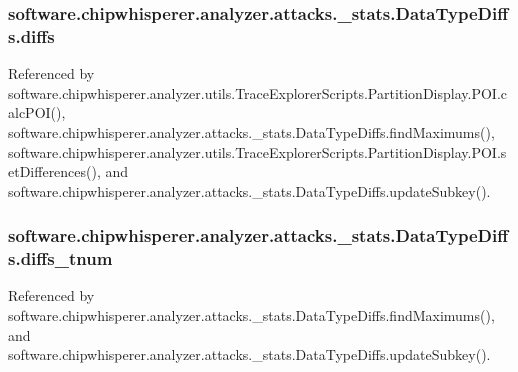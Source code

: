 \subsubsection[{diffs}]{\setlength{\rightskip}{0pt plus 5cm}software.\+chipwhisperer.\+analyzer.\+attacks.\+\_\+stats.\+Data\+Type\+Diffs.\+diffs}\label{classsoftware_1_1chipwhisperer_1_1analyzer_1_1attacks_1_1__stats_1_1DataTypeDiffs_adaab5796ed161daf2bcb0ee44930f34a}


Referenced by software.\+chipwhisperer.\+analyzer.\+utils.\+Trace\+Explorer\+Scripts.\+Partition\+Display.\+P\+O\+I.\+calc\+P\+O\+I(), software.\+chipwhisperer.\+analyzer.\+attacks.\+\_\+stats.\+Data\+Type\+Diffs.\+find\+Maximums(), software.\+chipwhisperer.\+analyzer.\+utils.\+Trace\+Explorer\+Scripts.\+Partition\+Display.\+P\+O\+I.\+set\+Differences(), and software.\+chipwhisperer.\+analyzer.\+attacks.\+\_\+stats.\+Data\+Type\+Diffs.\+update\+Subkey().

\hypertarget{classsoftware_1_1chipwhisperer_1_1analyzer_1_1attacks_1_1__stats_1_1DataTypeDiffs_a234110495a5f5f87a6d5a0e4e0db7860}{}
\subsubsection[{diffs\+\_\+tnum}]{\setlength{\rightskip}{0pt plus 5cm}software.\+chipwhisperer.\+analyzer.\+attacks.\+\_\+stats.\+Data\+Type\+Diffs.\+diffs\+\_\+tnum}\label{classsoftware_1_1chipwhisperer_1_1analyzer_1_1attacks_1_1__stats_1_1DataTypeDiffs_a234110495a5f5f87a6d5a0e4e0db7860}


Referenced by software.\+chipwhisperer.\+analyzer.\+attacks.\+\_\+stats.\+Data\+Type\+Diffs.\+find\+Maximums(), and software.\+chipwhisperer.\+analyzer.\+attacks.\+\_\+stats.\+Data\+Type\+Diffs.\+update\+Subkey().

\hypertarget{classsoftware_1_1chipwhisperer_1_1analyzer_1_1attacks_1_1__stats_1_1DataTypeDiffs_ae06b03c5b428cbf97d5d6d6927d0d149}{}
